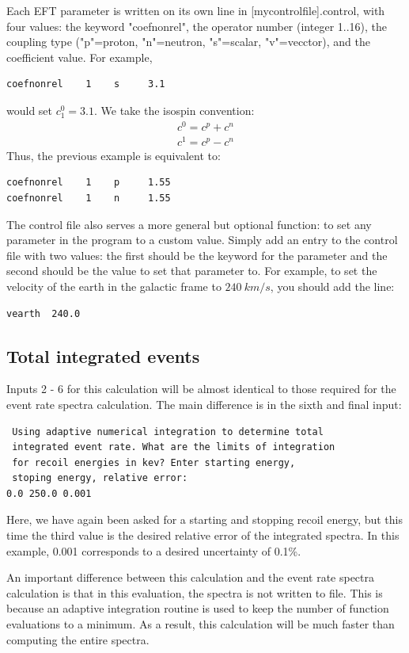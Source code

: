 \documentclass[11pt]{article}
\begin{document}
Each EFT parameter is written on its own line in [mycontrolfile].control, with
four values: the keyword "coefnonrel", the operator number (integer 1..16), the
coupling type ("p"=proton, "n"=neutron, "s"=scalar, "v"=vecctor), and the
coefficient value. For example, 
\begin{verbatim}
coefnonrel    1    s     3.1
\end{verbatim}
would set $c_1^0 = 3.1$. We take the isospin convention:
\begin{equation}
	\begin{split}
		c^0 = c^p + c^n\\
		c^1 = c^p - c^n
	\end{split}
\end{equation}
Thus, the previous example is equivalent to:
\begin{verbatim}
coefnonrel    1    p     1.55
coefnonrel    1    n     1.55
\end{verbatim}

The control file also serves a more general but optional function: to set any 
parameter in the program to a custom value.  
Simply add an entry to the control file with two values: the first 
should be the keyword for the parameter and the 
second should be the value to set that parameter to. For example, to set the 
velocity of the earth in the galactic frame to $240\ km/s$, you should add the line:
\begin{verbatim}
vearth  240.0
\end{verbatim}

\subsection{Total integrated events}
Inputs 2 - 6 for this calculation will be almost identical to those required for
the event rate spectra calculation. The main difference is in the sixth and
final input:
\begin{verbatim}
 Using adaptive numerical integration to determine total 
 integrated event rate. What are the limits of integration 
 for recoil energies in kev? Enter starting energy, 
 stoping energy, relative error:
0.0 250.0 0.001
\end{verbatim}
Here, we have again been asked for a starting and stopping recoil energy, but
this time the third value is the desired relative error of the integrated
spectra. In this example, 0.001 corresponds to a desired uncertainty of 0.1\%. 

An important difference between this calculation and the event rate spectra
calculation is that in this evaluation, the spectra is not written to file. This
is because an adaptive integration routine is used to keep the number of
function evaluations to a minimum. As a result, this calculation will be much
faster than computing the entire spectra.
\end{document}
